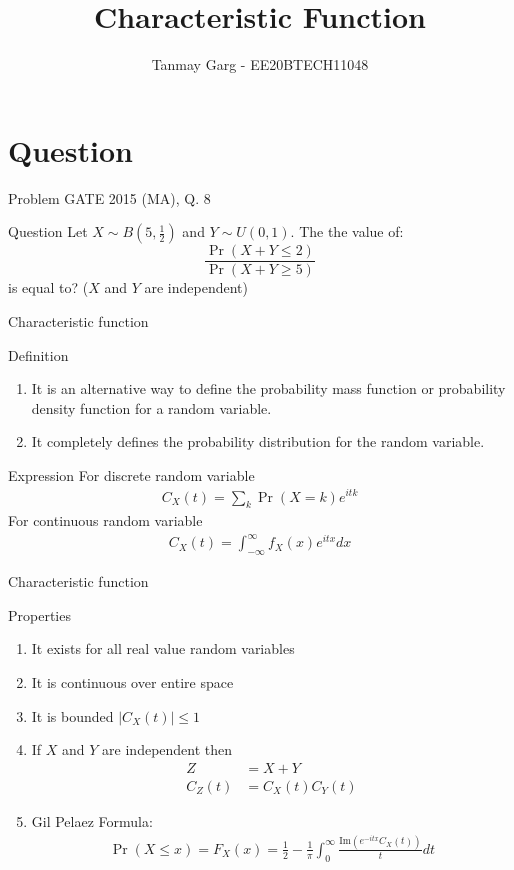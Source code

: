 \documentclass{beamer}
\title{Characteristic Function}
\author{Tanmay Garg - EE20BTECH11048}
\providecommand{\pr}[1]{\ensuremath{\Pr\left(#1\right)}}
\begin{document}
\begin{frame}
\titlepage
\end{frame}
\section{Question}
\begin{frame}{Problem GATE 2015 (MA), Q. 8}
\begin{block}{Question}
Let $X \sim B\left(5,\frac{1}{2}\right)$ and $Y \sim U(0,1)$. The the value of:
\[
    \frac{\pr{X+Y \leq 2}}{\pr{X+Y \geq 5}}
\]
is equal to? ($X$ and $Y$ are independent)

\end{block}
\end{frame}
\begin{frame}{Characteristic function}
   \begin{block}{Definition}
   \begin{enumerate}
       \item It is an alternative way to define the probability mass function or probability density function for a random variable.
       \item It completely defines the probability distribution for the random variable.
   \end{enumerate}
   \end{block}
   \begin{block}{Expression}
   For discrete random variable
   \begin{align}
       C_X(t)= \sum_{k}\pr{X=k}e^{itk}
   \end{align}
   For continuous random variable
   \begin{align}
       C_X(t)=\int_{-\infty}^\infty f_X(x)e^{itx}dx
   \end{align}
   \end{block}
\end{frame}
\begin{frame}{Characteristic function}
\begin{block}{Properties}
\begin{enumerate}
\item It exists for all real value random variables
    \item It is continuous over entire space
    \item It is bounded $|C_X(t)| \leq 1$
    \item If $X$ and $Y$ are independent then 
    \begin{align}
    Z &= X+Y\\
    C_Z(t) &= C_X(t)C_Y(t)
    \end{align}
    \item Gil Pelaez Formula:
    \begin{align}
        \pr{X \leq x}=F_X(x)=\frac{1}{2}-\frac{1}{\pi}\int_0^\infty \frac{\text{Im}\left(e^{-itx}C_X(t)\right)}{t}dt
    \end{align}
\end{enumerate}
\end{block}
\end{frame}
\end{document}
